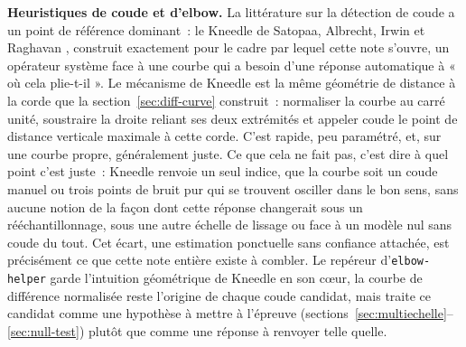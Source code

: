 \documentclass[11pt]{article}
\newcommand{\code}[1]{\texttt{#1}}
\begin{document}
\textbf{Heuristiques de coude et d'elbow.} La littérature sur la
détection de coude a un point de référence dominant~: le Kneedle de
Satopaa, Albrecht, Irwin et Raghavan \citep{satopaa2011}, construit
exactement pour le cadre par lequel cette note s'ouvre, un opérateur
système face à une courbe qui a besoin d'une réponse automatique à
« où cela plie-t-il ». Le mécanisme de Kneedle est la même géométrie de
distance à la corde que la section~\ref{sec:diff-curve} construit~:
normaliser la courbe au carré unité, soustraire la droite reliant ses
deux extrémités et appeler coude le point de distance verticale maximale
à cette corde. C'est rapide, peu paramétré, et, sur une courbe propre,
généralement juste. Ce que cela ne fait pas, c'est dire à quel point
c'est juste~: Kneedle renvoie un seul indice, que la courbe soit un coude
manuel ou trois points de bruit pur qui se trouvent osciller dans le bon
sens, sans aucune notion de la façon dont cette réponse changerait sous
un rééchantillonnage, sous une autre échelle de lissage ou face à un
modèle nul sans coude du tout. Cet écart, une estimation ponctuelle sans
confiance attachée, est précisément ce que cette note entière existe à
combler. Le repéreur d'\code{elbow-helper} garde l'intuition géométrique
de Kneedle en son cœur, la courbe de différence normalisée reste
l'origine de chaque coude candidat, mais traite ce candidat comme une
hypothèse à mettre à l'épreuve
(sections~\ref{sec:multiechelle}--\ref{sec:null-test}) plutôt que comme une
réponse à renvoyer telle quelle.
\end{document}
